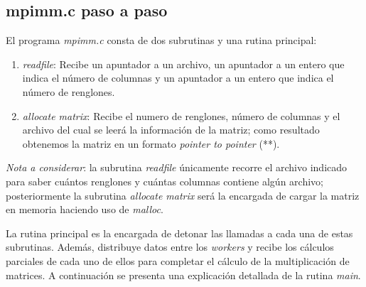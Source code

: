 \documentclass[DIV=calc, paper=letter, fontsize=11pt, twocolumn]{scrartcl}
\begin{document}
\subsection{mpimm.c paso a paso}

El programa \textit{mpimm.c} consta de dos subrutinas y una rutina principal:

\begin{enumerate}
    \item \textit{readfile}: Recibe un apuntador a un archivo, un apuntador a un entero que indica el número de columnas y un apuntador a un entero que indica el número de renglones.
    \item \textit{allocate matrix}: Recibe el numero de renglones, número de columnas y el archivo del cual se leerá la información de la matriz; como resultado obtenemos la matriz en un formato \textit{pointer to pointer} (**).
\end{enumerate}

\textit{Nota a considerar}: la subrutina \textit{readfile} únicamente recorre el archivo indicado para saber cuántos renglones y cuántas columnas contiene algún archivo; posteriormente la subrutina \textit{allocate matrix} será la encargada de cargar la matriz en memoria haciendo uso de \textit{malloc}.

La rutina principal es la encargada de detonar las llamadas a cada una de estas subrutinas. Además, distribuye datos entre los \textit{workers} y recibe los cálculos parciales de cada uno de ellos para completar el cálculo de la multiplicación de matrices. A continuación se presenta una explicación detallada de la rutina \textit{main}.
\end{document}

